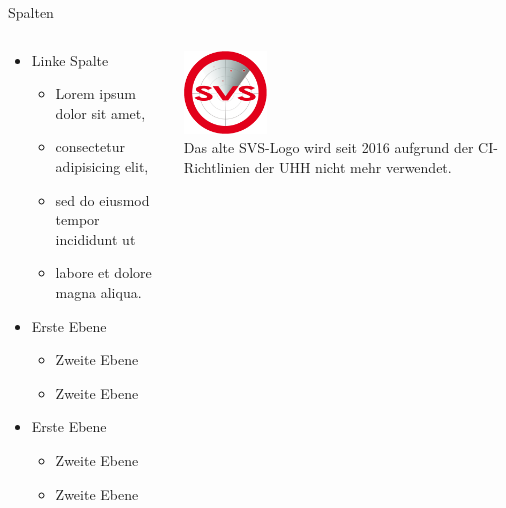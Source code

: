 \documentclass[t,aspectratio=169]{beamer}
\begin{document}
\begin{frame}{Spalten}
	\begin{columns}[T]
		\begin{column}{.6\textwidth}
			\begin{itemize}
				\item Linke Spalte
				\begin{itemize}
					\item Lorem ipsum dolor sit amet, 
					\item consectetur adipisicing elit, 
					\item sed do eiusmod tempor incididunt ut 
					\item labore et dolore magna aliqua. 
				\end{itemize}
				\item Erste Ebene
				\begin{itemize}
					\item Zweite Ebene
					\item Zweite Ebene
				\end{itemize}
				\item Erste Ebene
				\begin{itemize}
					\item Zweite Ebene
					\item Zweite Ebene
				\end{itemize}
			\end{itemize}
		\end{column}		
		\begin{column}{.4\textwidth}
			\begin{center}
				\vspace{0.5cm}
				\includegraphics[width=2.2cm]{../pic/svs_logo_uhhred.png} \\
				\small
				Das alte SVS-Logo wird seit 2016 aufgrund der CI-Richtlinien der UHH nicht mehr verwendet.
			\end{center}
		\end{column}
	\end{columns}	
\end{frame}
\end{document}
